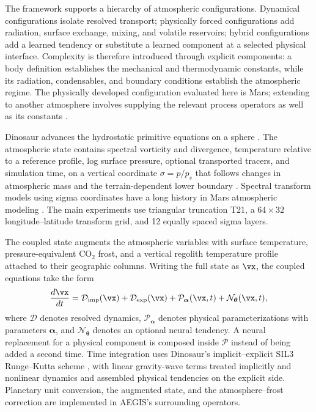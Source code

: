 \documentclass{article} %
\newcommand{\co}{CO$_2$}
\begin{document}
The framework supports a hierarchy of atmospheric configurations. Dynamical configurations isolate resolved transport; physically forced configurations add radiation, surface exchange, mixing, and volatile reservoirs; hybrid configurations add a learned tendency or substitute a learned component at a selected physical interface. Complexity is therefore introduced through explicit components: a body definition establishes the mechanical and thermodynamic constants, while its radiation, condensables, and boundary conditions establish the atmospheric regime. The physically developed configuration evaluated here is Mars; extending to another atmosphere involves supplying the relevant process operators as well as its constants \citep{hu2025stablemachinelearningparameterizationsubgrid}.

Dinosaur advances the hydrostatic primitive equations on a sphere \citep{kochkov2024,davenport2026}. The atmospheric state contains spectral vorticity and divergence, temperature relative to a reference profile, log surface pressure, optional transported tracers, and simulation time, on a vertical coordinate $\sigma=p/p_s$ that follows changes in atmospheric mass and the terrain-dependent lower boundary \citep{kochkov2024}.
Spectral transform models using sigma coordinates have a long history in Mars atmospheric modeling \citep{wilson1997stationarywaves}. The main experiments use triangular truncation T21, a $64\times32$ longitude--latitude transform grid, and 12 equally spaced sigma layers.

The coupled state augments the atmospheric variables with surface temperature, pressure-equivalent \co{} frost, and a vertical regolith temperature profile attached to their geographic columns. Writing the full state as $\vx$, the coupled equations take the form
\begin{equation}
 \frac{d\vx}{dt}=\mathcal{D}_{\mathrm{imp}}(\vx)
 +\mathcal{D}_{\mathrm{exp}}(\vx)
 +\mathcal{P}_{\boldsymbol{\alpha}}(\vx,t)
 +\mathcal{N}_{\boldsymbol{\theta}}(\vx,t),
 \label{eq:coupled}
\end{equation}
where $\mathcal{D}$ denotes resolved dynamics, $\mathcal{P}_{\boldsymbol{\alpha}}$ denotes physical parameterizations with parameters $\boldsymbol{\alpha}$, and $\mathcal{N}_{\boldsymbol{\theta}}$ denotes an optional neural tendency. A neural replacement for a physical component is composed inside $\mathcal{P}$ instead of being added a second time. Time integration uses Dinosaur's implicit--explicit SIL3 Runge--Kutta scheme \citep{whitaker2013}, with linear gravity-wave terms treated implicitly and nonlinear dynamics and assembled physical tendencies on the explicit side. Planetary unit conversion, the augmented state, and the atmosphere--frost correction are implemented in AEGIS's surrounding operators.
\end{document}
